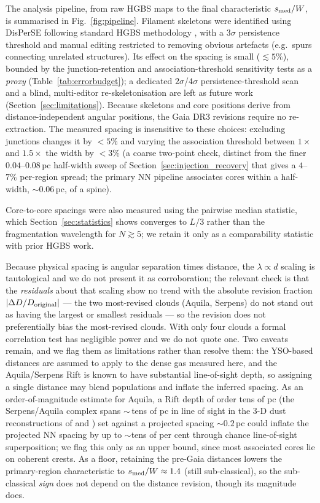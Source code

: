 \documentclass[usenatbib,twoside,twocolumn]{mnras}
\begin{document}
The analysis pipeline, from raw HGBS maps to the final characteristic $s_{\rm med}/W$, is summarised in Fig.~\ref{fig:pipeline}. Filament skeletons were identified using DisPerSE \citep{Sousbie2011} following standard HGBS methodology \citep{Arzoumanian2011}, with a $3\sigma$ persistence threshold and manual editing restricted to removing obvious artefacts (e.g.\ spurs connecting unrelated structures). Its effect on the spacing is small ($\lesssim5\%$), bounded by the junction-retention and association-threshold sensitivity tests as a \emph{proxy} (Table~\ref{tab:errorbudget}); a dedicated $2\sigma$/$4\sigma$ persistence-threshold scan and a blind, multi-editor re-skeletonisation are left as future work (Section~\ref{sec:limitations}). Because skeletons and core positions derive from distance-independent angular positions, the Gaia DR3 revisions require no re-extraction. The measured spacing is insensitive to these choices: excluding junctions changes it by $<5\%$ and varying the association threshold between $1\times$ and $1.5\times$ the width by $<3\%$ (a coarse two-point check, distinct from the finer $0.04$--$0.08$\,pc half-width sweep of Section~\ref{sec:injection_recovery} that gives a $4$--$7\%$ per-region spread; the primary NN pipeline associates cores within a half-width, $\sim0.06$\,pc, of a spine).

Core-to-core spacings were also measured using the pairwise median statistic, which Section~\ref{sec:statistics} shows converges to $L/3$ rather than the fragmentation wavelength for $N\gtrsim5$; we retain it only as a comparability statistic with prior HGBS work.

Because physical spacing is angular separation times distance, the $\lambda\propto d$ scaling is tautological and we do not present it as corroboration; the relevant check is that the \emph{residuals} about that scaling show no trend with the absolute revision fraction $|\Delta D/D_{\rm original}|$ --- the two most-revised clouds (Aquila, Serpens) do not stand out as having the largest or smallest residuals --- so the revision does not preferentially bias the most-revised clouds. With only four clouds a formal correlation test has negligible power and we do not quote one. Two caveats remain, and we flag them as limitations rather than resolve them: the YSO-based distances \citep{Zhang2023} are assumed to apply to the dense gas measured here, and the Aquila/Serpens Rift is known to have substantial line-of-sight depth, so assigning a single distance may blend populations and inflate the inferred spacing. As an order-of-magnitude estimate for Aquila, a Rift depth of order tens of pc (the Serpens/Aquila complex spans $\sim$\,tens of pc in line of sight in the 3-D dust reconstructions of \citealt{Zucker2020} and \citealt{Green2024}) set against a projected spacing $\sim0.2$\,pc could inflate the projected NN spacing by up to $\sim$tens of per cent through chance line-of-sight superposition; we flag this only as an upper bound, since most associated cores lie on coherent crests. As a floor, retaining the pre-Gaia distances lowers the primary-region characteristic to $s_{\rm med}/W\approx1.4$ (still sub-classical), so the sub-classical \emph{sign} does not depend on the distance revision, though its magnitude does.
\end{document}
